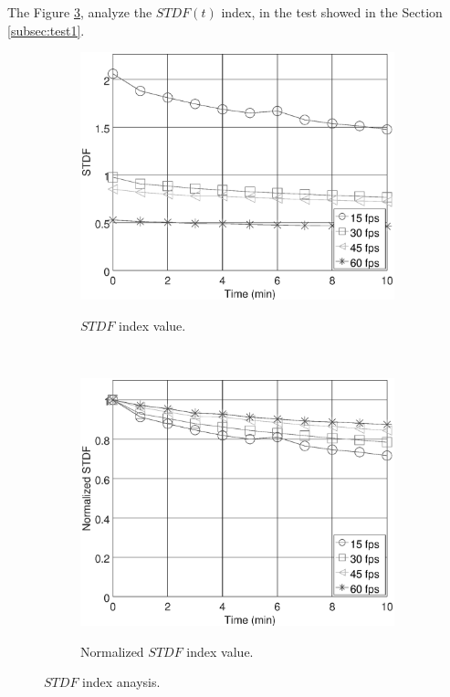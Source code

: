 \documentclass[review]{elsarticle}
\begin{document}
The Figure \ref{fig:STDFtest1}, analyze the $STDF(t)$ index, in the test showed in the 
Section \ref{subsec:test1}.
\begin{figure}[ht!]
    \centering
    \begin{subfigure}{0.48\textwidth}
        \caption{$STDF$ index value.}
        \includegraphics[width=\textwidth]{FPS_f11_rawSTDF.eps}
        \label{fig:stdfraw}
    \end{subfigure}
    ~ %
    \begin{subfigure}{0.48\textwidth}
        \caption{Normalized $STDF$ index value.}
        \includegraphics[width=\textwidth]{FPS_f11_norm1STDF.eps}
        \label{fig:stdfnorm}
    \end{subfigure}
    \caption{$STDF$ index anaysis.}\label{fig:STDFtest1}
\end{figure}
\end{document}
